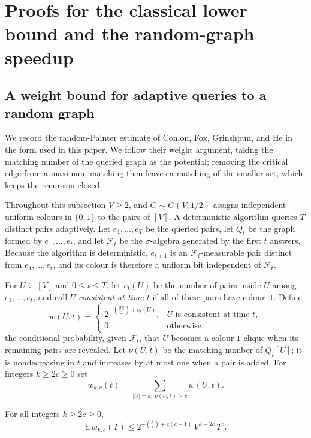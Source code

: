 \section{Proofs for the classical lower bound and the random-graph speedup}
\label{app:classical-lower}

\subsection{A weight bound for adaptive queries to a random graph}
\label{app:weight-bound}

We record the random-Painter estimate of Conlon, Fox, Grinshpun, and He
\cite[proof of Theorem~1]{ConlonFoxGrinshpunHe2019} in the form used in
this paper.  We follow their weight argument, taking the matching number
of the queried graph as the potential; removing the critical edge from a
maximum matching then leaves a matching of the smaller set, which keeps the
recursion closed.

Throughout this subsection $V\ge2$, and $G\sim G(V,1/2)$ assigns
independent uniform colours in $\{0,1\}$ to the pairs of $[V]$.  A
deterministic algorithm queries $T$ distinct pairs adaptively.  Let
$e_1,\ldots,e_T$ be the queried pairs, let $Q_t$ be the graph formed by
$e_1,\ldots,e_t$, and let $\mathcal F_t$ be the $\sigma$-algebra generated
by the first $t$ answers.  Because the algorithm is deterministic, $e_{t+1}$
is an $\mathcal F_t$-measurable pair distinct from $e_1,\ldots,e_t$, and its
colour is therefore a uniform bit independent of $\mathcal F_t$.

For $U\subseteq[V]$ and $0\le t\le T$, let $e_t(U)$ be the number of pairs
inside $U$ among $e_1,\ldots,e_t$, and call $U$ \emph{consistent at time
$t$} if all of these pairs have colour~$1$.  Define
\[
 w(U,t)=
 \begin{cases}
 2^{-\binom{|U|}2+e_t(U)}, & U\text{ is consistent at time }t,\\
 0,&\text{otherwise},
 \end{cases}
\]
the conditional probability, given $\mathcal F_t$, that $U$ becomes a
colour-$1$ clique when its remaining pairs are revealed.  Let $\nu(U,t)$ be
the matching number of $Q_t[U]$; it is nondecreasing in $t$ and increases by
at most one when a pair is added.  For integers $k\ge2c\ge0$ set
\[
 w_{k,c}(t)=\sum_{|U|=k,\ \nu(U,t)\ge c}w(U,t).
\]

\begin{lemma}\label{lem:weight-bound}
For all integers $k\ge2c\ge0$,
\[
 \mathbb E\,w_{k,c}(T)\le 2^{-\binom k2+c(c-1)}\,V^{k-2c}\,T^{c}.
\]
\end{lemma}


